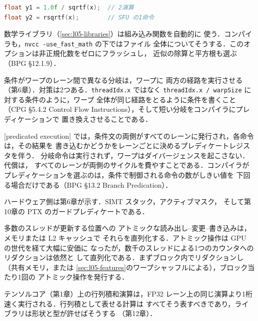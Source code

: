 \documentclass[../main.tex]{subfiles}
\begin{document}
\begin{description}
\begin{lstlisting}[language=C++, numbers=none]
float y1 = 1.0f / sqrtf(x);  // 2演算
float y2 = rsqrtf(x);        // SFU の1命令
\end{lstlisting}
    数学ライブラリ（\cref{sec:l05-libraries}）は組み込み関数を自動的に
    使う．コンパイラも，\texttt{nvcc -use\_fast\_math} の下ではファイル
    全体についてそうする．このオプションは非正規化数をゼロにフラッシュし，
    近似の除算と平方根も選ぶ（BPG §12.1.9）．
  \item[分岐の削減．]  条件がワープのレーン間で異なる分岐は，ワープに
    両方の経路を実行させる（第6章）．対策は2つある．\texttt{threadIdx.x}
    ではなく \texttt{threadIdx.x / warpSize} に対する条件のように，ワープ
    全体が同じ経路をとるように条件を書くこと（CPG §5.4.2 Control Flow
    Instructions），そして短い分岐をコンパイラにプレディケーションで
    置き換えさせることである．
    \begin{definition}[プレディケート実行]
      [predicated execution]
      では，条件文の両側がすべてのレーンに発行され，各命令は，その結果を
      書き込むかどうかをレーンごとに決めるプレディケートレジスタを伴う．
      分岐命令は実行されず，ワープはダイバージェンスを起こさない．代償は，
      すべてのレーンが両側のサイクルを費やすことである．コンパイラが
      プレディケーションを選ぶのは，条件で制御される命令の数がしきい値を
      下回る場合だけである（BPG §13.2 Branch Predication）．
    \end{definition}
    ハードウェア側は第6章が示す．SIMT スタック，アクティブマスク，
    そして第10章の PTX のガードプレディケートである．
  \item[アトミック操作を避ける．]  多数のスレッドが更新する位置への
    アトミックな読み出し--変更--書き込みは，メモリまたは L2 キャッシュで
    それらを直列化する．アトミック操作は GPU の世代を経て大幅に安価に
    なったが，数千のスレッドによる1つのカウンタへのリダクションは依然と
    して直列化である．まずブロック内でリダクションし（共有メモリ，または
    \cref{sec:l05-features}のワープシャッフルによる），ブロック当たり1回の
    アトミック操作を発行する．
  \item[テンソルコア．]  テンソルコア（第1章）上の行列積和演算は，FP32
    レーン上の同じ演算より1桁速く実行される．行列積として表せる計算は
    すべてそう表すべきであり，ライブラリは形状と型が許せばそうする
    （第12章）．
\end{description}
\end{document}
